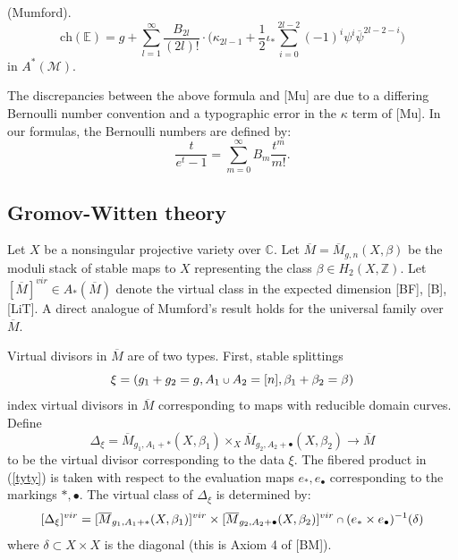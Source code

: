 \documentclass[11 pt]{amsart}
\newcommand{\rarr}{\rightarrow}
\newcommand{\com}{\mathbb{C}}
\newcommand{\Z}{\mathbb{Z}}
\def\scup{\mathbin{\text{\scriptsize$\cup$}}}
\def\scap{\mathbin{\text{\scriptsize$\cap$}}}
\newcommand{\hodge}{\mathbb{E}}
\newcommand{\ch}{\text{ch}}
\newcommand{\CM}{\mathcal{M}}
\begin{document}
\vspace{+10pt}
 (Mumford).
$$\ch (\hodge) =
g + \sum_{l=1}^{\infty} \frac{ B_{2l}}{(2l)!}
\cdot \Big( \kappa_{2l-1} + \frac{1}{2} \iota_* \sum_{i=0}^{2l-2}
(-1)^i \psi^i \overline{\psi}^{2l-2-i} \Big)$$
in $A^*(\CM)$.

\vspace{+10pt}
\noindent The discrepancies between the above formula
and [Mu] are due to a differing Bernoulli number convention
and a typographic error in the $\kappa$ term of [Mu]. In our
formulas, the Bernoulli numbers are defined by:
\begin{equation*}
\dfrac{t}{e^t-1} = \sum\limits_{m=0}^{\infty}B_m\dfrac{t^m}{m!}.
\end{equation*}


\subsection{Gromov-Witten theory}
Let $X$ be a nonsingular projective variety over $\com$.
Let $\overline{M} =\overline{M}_{g,n}(X,\beta)$ be the moduli stack of
stable maps to $X$ representing the class $\beta \in H_2(X, \Z)$.
Let $[\overline{M}]^{vir} \in A_{*} (\overline{M})$
denote the virtual class in the expected dimension
[BF], [B], [LiT].
A direct analogue of Mumford's result holds for the
universal family over $\overline{M}$.

Virtual divisors in $\overline{M}$ are of two types.
First, stable splittings
\begin{equation}
\label{wqwt} 
\xi =(g_1+g_2=g, A_1 \scup A_2 =[n], \beta_1+\beta_2=\beta)
\end{equation}
index  virtual divisors in $\overline{M}$ corresponding
to maps with reducible domain curves. Define
\begin{equation}
\label{tyty}
\Delta_\xi = \overline{M}_{g_1, A_1+*}(X, \beta_1) \times_X
\overline{M}_{g_2, A_2+\bullet}(X, \beta_2) 
{\rarr} \overline{M}
\end{equation}
to
be the virtual divisor corresponding to the data $\xi$.
The fibered product in (\ref{tyty}) is taken with respect
to the evaluation maps $e_*, e_\bullet$
corresponding to the markings $*, \bullet$.
The virtual class of $\Delta_\xi$ is determined by:
$$[\Delta_\xi]^{vir} = [\overline{M}_{g_1, A_1+*}(X, \beta_1)]^{vir} 
\times [\overline{M}_{g_2, A_2+\bullet}(X, \beta_2)]^{vir}
\scap (e_*\times e_\bullet)^{-1} (\delta)$$
where $\delta \subset X\times X$ is the diagonal
(this is Axiom 4 of [BM]). 
\end{document}
